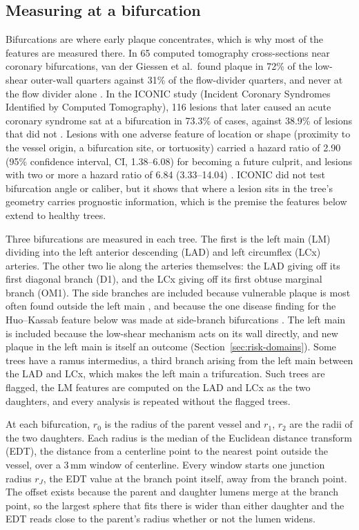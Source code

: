 \subsection{Measuring at a bifurcation}

Bifurcations are where early plaque concentrates, which is why most of the features are measured there.
In 65 computed tomography cross-sections near coronary bifurcations, van der Giessen et al.\ found plaque in 72\% of the low-shear outer-wall quarters against 31\% of the flow-divider quarters, and never at the flow divider alone \cite{vandergiessen2009bifurcation}.
In the ICONIC study (Incident Coronary Syndromes Identified by Computed Tomography), 116 lesions that later caused an acute coronary syndrome sat at a bifurcation in 73.3\% of cases, against 38.9\% of lesions that did not \cite{han2022plaque}.
Lesions with one adverse feature of location or shape (proximity to the vessel origin, a bifurcation site, or tortuosity) carried a hazard ratio of 2.90 (95\% confidence interval, CI, 1.38--6.08) for becoming a future culprit, and lesions with two or more a hazard ratio of 6.84 (3.33--14.04) \cite{han2022plaque}.
ICONIC did not test bifurcation angle or caliber, but it shows that where a lesion sits in the tree's geometry carries prognostic information, which is the premise the features below extend to healthy trees.

Three bifurcations are measured in each tree.
The first is the left main (LM) dividing into the left anterior descending (LAD) and left circumflex (LCx) arteries.
The other two lie along the arteries themselves: the LAD giving off its first diagonal branch (D1), and the LCx giving off its first obtuse marginal branch (OM1).
The side branches are included because vulnerable plaque is most often found outside the left main \cite{shen2026geometry}, and because the one disease finding for the Huo--Kassab feature below was made at side-branch bifurcations \cite{schoenenberger2012murray}.
The left main is included because the low-shear mechanism acts on its wall directly, and new plaque in the left main is itself an outcome (Section~\ref{sec:risk-domains}).
Some trees have a ramus intermedius, a third branch arising from the left main between the LAD and LCx, which makes the left main a trifurcation.
Such trees are flagged, the LM features are computed on the LAD and LCx as the two daughters, and every analysis is repeated without the flagged trees.

At each bifurcation, $r_0$ is the radius of the parent vessel and $r_1$, $r_2$ are the radii of the two daughters.
Each radius is the median of the Euclidean distance transform (EDT), the distance from a centerline point to the nearest point outside the vessel, over a 3\,mm window of centerline.
Every window starts one junction radius $r_J$, the EDT value at the branch point itself, away from the branch point.
The offset exists because the parent and daughter lumens merge at the branch point, so the largest sphere that fits there is wider than either daughter and the EDT reads close to the parent's radius whether or not the lumen widens.


